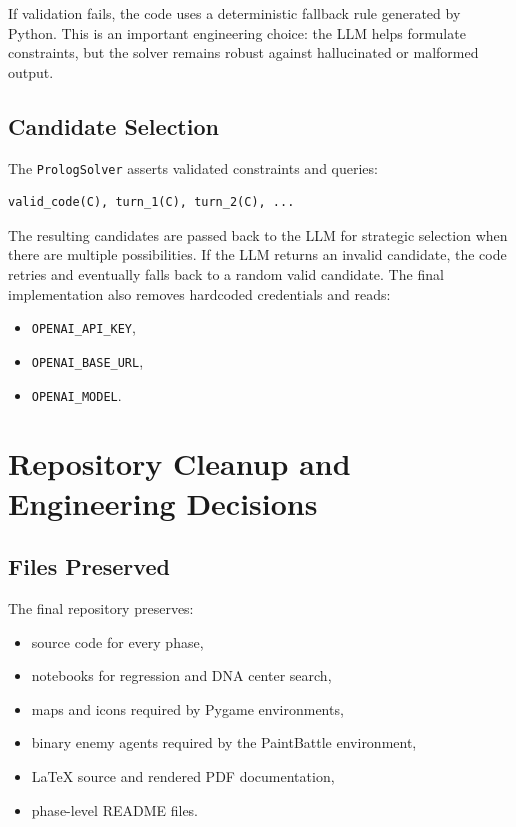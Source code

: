 \documentclass[11pt,a4paper]{article}
\newcommand{\code}[1]{\texttt{#1}}
\begin{document}
If validation fails, the code uses a deterministic fallback rule generated by Python. This is an important engineering choice: the LLM helps formulate constraints, but the solver remains robust against hallucinated or malformed output.

\subsection{Candidate Selection}

The \code{PrologSolver} asserts validated constraints and queries:

\begin{lstlisting}
valid_code(C), turn_1(C), turn_2(C), ...
\end{lstlisting}

The resulting candidates are passed back to the LLM for strategic selection when there are multiple possibilities. If the LLM returns an invalid candidate, the code retries and eventually falls back to a random valid candidate. The final implementation also removes hardcoded credentials and reads:

\begin{itemize}[leftmargin=*]
    \item \code{OPENAI\_API\_KEY},
    \item \code{OPENAI\_BASE\_URL},
    \item \code{OPENAI\_MODEL}.
\end{itemize}

\section{Repository Cleanup and Engineering Decisions}

\subsection{Files Preserved}

The final repository preserves:

\begin{itemize}[leftmargin=*]
    \item source code for every phase,
    \item notebooks for regression and DNA center search,
    \item maps and icons required by Pygame environments,
    \item binary enemy agents required by the PaintBattle environment,
    \item LaTeX source and rendered PDF documentation,
    \item phase-level README files.
\end{itemize}
\end{document}
